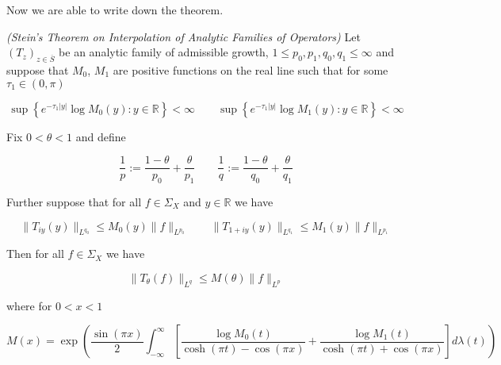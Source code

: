 \vspace{2mm}

Now we are able to write down the theorem.

\vspace{2mm}

\begin{mdframed}
	\begin{theorem}\emph{(Stein's Theorem on Interpolation of Analytic Families of Operators)}
		Let $\left( T_z \right)_{z \in \overline{S}}$ be an analytic family of admissible growth, $1 \leqslant p_0,p_1,q_0,q_1 \leqslant \infty$ and suppose that $M_0$, $M_1$ are positive functions on the real line such that for some $\tau_1 \in (0,\pi)$

			\begin{equation}
				\sup\left\{e^{-\tau_1 \vert y \vert} \log M_0(y) : y \in \mathbb{R}\right\} < \infty \qquad \sup\left\{e^{-\tau_1 \vert y \vert} \log M_1(y) : y \in \mathbb{R}\right\} < \infty
			\end{equation}

			Fix $0 < \theta < 1$ and define

			\begin{equation}
				\frac{1}{p} := \frac{1 - \theta}{p_0} + \frac{\theta}{p_1} \qquad \frac{1}{q} := \frac{1 - \theta}{q_0} + \frac{\theta}{q_1}
			\end{equation}

			Further suppose that for all $f \in \Sigma_X$ and $y \in \mathbb{R}$ we have

			\begin{equation}
				\|T_{iy}(y)\|_{L^{q_0}} \leqslant M_0(y)\|f\|_{L^{p_0}} \qquad \|T_{1 + iy}(y)\|_{L^{q_1}} \leqslant M_1(y)\|f\|_{L^{p_1}} 
			\end{equation}

			Then for all $f \in \Sigma_X$ we have

			\begin{equation*}
				\|T_\theta(f)\|_{L^q} \leqslant M(\theta)\|f\|_{L^p}
			\end{equation*}

			where for $0 < x < 1$

			\begin{equation*}
				M(x) = \exp\left( \frac{\sin(\pi x)}{2} \int_{-\infty}^\infty \left[ \frac{\log M_0(t)}{\cosh(\pi t) - \cos(\pi x)} + \frac{\log M_1(t)}{\cosh(\pi t) + \cos(\pi x)}\right] d\lambda(t) \right)
			\end{equation*}
	\end{theorem}
\end{mdframed}

